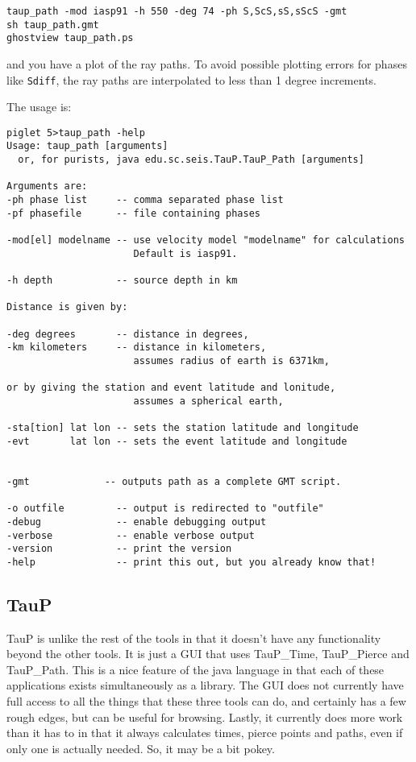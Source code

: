 \begin{verbatim}
taup_path -mod iasp91 -h 550 -deg 74 -ph S,ScS,sS,sScS -gmt
sh taup_path.gmt
ghostview taup_path.ps
\end{verbatim}

and you have a plot of the ray paths. To avoid possible plotting errors for
phases like \texttt{Sdiff}, the ray paths are interpolated to less than 
1 degree increments.

The usage is:
\begin{verbatim}
piglet 5>taup_path -help
Usage: taup_path [arguments]
  or, for purists, java edu.sc.seis.TauP.TauP_Path [arguments]

Arguments are:
-ph phase list     -- comma separated phase list
-pf phasefile      -- file containing phases

-mod[el] modelname -- use velocity model "modelname" for calculations
                      Default is iasp91.

-h depth           -- source depth in km

Distance is given by:

-deg degrees       -- distance in degrees,
-km kilometers     -- distance in kilometers,
                      assumes radius of earth is 6371km,

or by giving the station and event latitude and lonitude,
                      assumes a spherical earth,

-sta[tion] lat lon -- sets the station latitude and longitude
-evt       lat lon -- sets the event latitude and longitude


-gmt             -- outputs path as a complete GMT script.

-o outfile         -- output is redirected to "outfile"
-debug             -- enable debugging output
-verbose           -- enable verbose output
-version           -- print the version
-help              -- print this out, but you already know that!
\end{verbatim} 

\subsection{TauP}
TauP is unlike the rest of the tools in that it doesn't have any functionality
 beyond the other tools. It is just a GUI that uses TauP\_Time, TauP\_Pierce
and TauP\_Path. This is a nice feature of the java language in that each of 
these applications exists simultaneously as a library. The GUI does not 
currently have full access to all the things that these 
three tools can do, and certainly has a few rough edges, but can be useful
for browsing. Lastly, it currently does more work than it has to in that it
always calculates times, pierce points and paths, even if only one is actually
needed. So, it may be a bit pokey.

